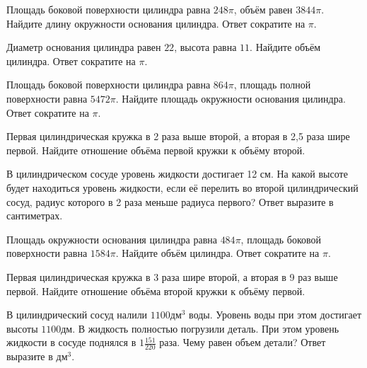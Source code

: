 \documentclass[4apaper]{article}
\begin{document}
\begin{taskBN}{64}
Площадь боковой поверхности цилиндра равна $248\pi$, объём равен $3844\pi$. Найдите длину окружности основания цилиндра. Ответ сократите на $\pi$.
\end{taskBN}

\begin{taskBN}{65}
Диаметр основания цилиндра равен $22$, высота равна $11$. Найдите объём цилиндра. Ответ сократите на $\pi$.
\end{taskBN}

\begin{taskBN}{66}
Площадь боковой поверхности цилиндра равна $864\pi$, площадь полной поверхности равна $5472\pi$. Найдите площадь окружности основания цилиндра. Ответ сократите на $\pi$.
\end{taskBN}

\begin{taskBN}{67}
 Первая цилиндрическая кружка в 2 раза выше второй, а вторая в 2,5 раза шире первой. Найдите отношение объёма первой кружки к объёму второй.
\end{taskBN}

\begin{taskBN}{68}
В цилиндрическом сосуде уровень жидкости достигает 12 см. На какой высоте будет находиться уровень жидкости, если её перелить во второй цилиндрический сосуд, радиус которого в 2 раза меньше радиуса первого? Ответ выразите в сантиметрах.
\end{taskBN}

\begin{taskBN}{69}
Площадь окружности основания цилиндра равна $484\pi$, площадь боковой поверхности равна $1584\pi$. Найдите объём цилиндра. Ответ сократите на $\pi$.
\end{taskBN}

\begin{taskBN}{70}
 Первая цилиндрическая кружка в 3 раза шире второй, а вторая в 9 раз выше первой. Найдите отношение объёма второй кружки к объёму первой.
\end{taskBN}

\begin{taskBN}{71}
В цилиндрический сосуд налили $1100\mbox{дм}^3$ воды. Уровень воды при этом достигает высоты $1100$дм. В жидкость полностью погрузили деталь. При этом уровень жидкости в сосуде поднялся в ${1}\frac{151}{220}$ раза. Чему равен объем детали? Ответ выразите в $\mbox{дм}^3$.
\end{taskBN}
\end{document}
